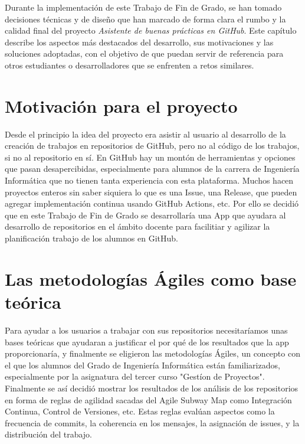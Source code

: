 
Durante la implementación de este Trabajo de Fin de Grado, se han tomado decisiones técnicas y de diseño que han marcado de forma clara el rumbo y la calidad final del proyecto \textit{Asistente de buenas prácticas en GitHub}. Este capítulo describe los aspectos más destacados del desarrollo, sus motivaciones y las soluciones adoptadas, con el objetivo de que puedan servir de referencia para otros estudiantes o desarrolladores que se enfrenten a retos similares.

\section{Motivación para el proyecto}
Desde el principio la idea del proyecto era asistir al usuario al desarrollo de la creación de trabajos en repositorios de GitHub, pero no al código de los trabajos, si no al repositorio en sí. En GitHub hay un montón de herramientas y opciones que pasan desapercibidas, especialmente para alumnos de la carrera de Ingeniería Informática que no tienen tanta experiencia con esta plataforma. Muchos hacen proyectos enteros sin saber siquiera lo que es una Issue, una Release, que pueden agregar implementación continua usando GitHub Actions, etc. Por ello se decidió que en este Trabajo de Fin de Grado se desarrollaría una App que ayudara al desarrollo de repositorios en el ámbito docente para facilitiar y agilizar la planificación trabajo de los alumnos en GitHub.

\section{Las metodologías Ágiles como base teórica}

Para ayudar a los usuarios a trabajar con sus repositorios necesitaríamos unas bases teóricas que ayudaran a justificar el por qué de los resultados que la app proporcionaría, y finalmente se eligieron las metodologías Ágiles, un concepto con el que los alumnos del Grado de Ingeniería Informática están familiarizados, especialmente por la asignatura del tercer curso "Gestíon de Proyectos". Finalmente se así decidió mostrar los resultados de los análisis de los repositorios en forma de reglas de agilidad sacadas del Agile Subway Map \cite{agileSubwayMap} como Integración Continua, Control de Versiones, etc. Estas reglas evalúan aspectos como la frecuencia de commits, la coherencia en los mensajes, la asignación de issues, y la distribución del trabajo.


